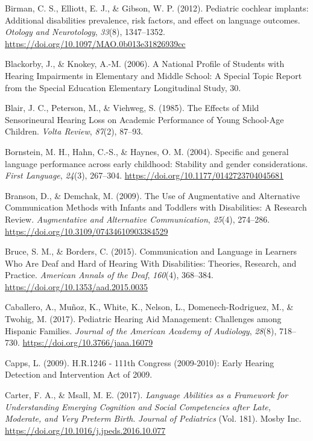 \documentclass[english,man]{apa6}
\begin{document}
\leavevmode\hypertarget{ref-birman2012}{}%
Birman, C. S., Elliott, E. J., \& Gibson, W. P. (2012). Pediatric cochlear implants: Additional disabilities prevalence, risk factors, and effect on language outcomes. \emph{Otology and Neurotology}, \emph{33}(8), 1347--1352. \url{https://doi.org/10.1097/MAO.0b013e31826939cc}

\leavevmode\hypertarget{ref-blackorby2006}{}%
Blackorby, J., \& Knokey, A.-M. (2006). A National Profile of Students with Hearing Impairments in Elementary and Middle School: A Special Topic Report from the Special Education Elementary Longitudinal Study, 30.

\leavevmode\hypertarget{ref-blair1985}{}%
Blair, J. C., Peterson, M., \& Viehweg, S. (1985). The Effects of Mild Sensorineural Hearing Loss on Academic Performance of Young School-Age Children. \emph{Volta Review}, \emph{87}(2), 87--93.

\leavevmode\hypertarget{ref-bornstein2004}{}%
Bornstein, M. H., Hahn, C.-S., \& Haynes, O. M. (2004). Specific and general language performance across early childhood: Stability and gender considerations. \emph{First Language}, \emph{24}(3), 267--304. \url{https://doi.org/10.1177/0142723704045681}

\leavevmode\hypertarget{ref-branson2009}{}%
Branson, D., \& Demchak, M. (2009). The Use of Augmentative and Alternative Communication Methods with Infants and Toddlers with Disabilities: A Research Review. \emph{Augmentative and Alternative Communication}, \emph{25}(4), 274--286. \url{https://doi.org/10.3109/07434610903384529}

\leavevmode\hypertarget{ref-bruce2015}{}%
Bruce, S. M., \& Borders, C. (2015). Communication and Language in Learners Who Are Deaf and Hard of Hearing With Disabilities: Theories, Research, and Practice. \emph{American Annals of the Deaf}, \emph{160}(4), 368--384. \url{https://doi.org/10.1353/aad.2015.0035}

\leavevmode\hypertarget{ref-caballero2017}{}%
Caballero, A., Muñoz, K., White, K., Nelson, L., Domenech-Rodriguez, M., \& Twohig, M. (2017). Pediatric Hearing Aid Management: Challenges among Hispanic Families. \emph{Journal of the American Academy of Audiology}, \emph{28}(8), 718--730. \url{https://doi.org/10.3766/jaaa.16079}

\leavevmode\hypertarget{ref-capps2009}{}%
Capps, L. (2009). H.R.1246 - 111th Congress (2009-2010): Early Hearing Detection and Intervention Act of 2009.

\leavevmode\hypertarget{ref-carter2017}{}%
Carter, F. A., \& Msall, M. E. (2017). \emph{Language Abilities as a Framework for Understanding Emerging Cognition and Social Competencies after Late, Moderate, and Very Preterm Birth}. \emph{Journal of Pediatrics} (Vol. 181). Mosby Inc. \url{https://doi.org/10.1016/j.jpeds.2016.10.077}
\end{document}
